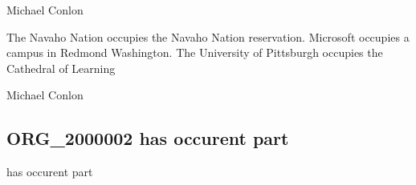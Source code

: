 \documentclass[letterpaper,10pt,english]{sphinxmanual}
\begin{document}
\begin{sphinxShadowBox}

\sphinxAtStartPar
Michael Conlon 
\end{sphinxShadowBox}

\begin{sphinxShadowBox}

\sphinxAtStartPar
{\hyperref[\detokenize{doc-ORG_0000001::doc}]{}}
\end{sphinxShadowBox}

\begin{sphinxShadowBox}

\sphinxAtStartPar
{\hyperref[\detokenize{doc-ORG_0000045::doc}]{}}
\end{sphinxShadowBox}

\begin{sphinxShadowBox}

\sphinxAtStartPar
The Navaho Nation occupies the Navaho Nation reservation.  Microsoft occupies a campus in Redmond Washington.  The University of Pittsburgh occupies the Cathedral of Learning
\end{sphinxShadowBox}

\begin{sphinxShadowBox}

\sphinxAtStartPar
Michael Conlon 
\end{sphinxShadowBox}
\begin{quote}

\ignorespaces \end{quote}


\subsection{ORG\_2000002 \sphinxhyphen{} has occurent part}
\label{\detokenize{doc-ORG_2000002:org-2000002-has-occurent-part}}\label{\detokenize{doc-ORG_2000002:index-0}}\label{\detokenize{doc-ORG_2000002::doc}}
\begin{sphinxShadowBox}

\sphinxAtStartPar
has occurent part
\end{sphinxShadowBox}
\end{document}
